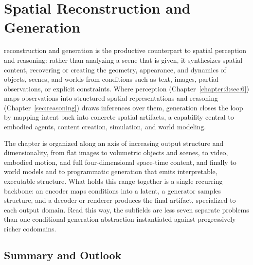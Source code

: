 

\chapter{Spatial Reconstruction and Generation}
\label{sec:generation}


 reconstruction and generation is the productive counterpart to spatial perception and reasoning: rather than analyzing a scene that is given, it synthesizes spatial content, recovering or creating the geometry, appearance, and dynamics of objects, scenes, and worlds from conditions such as text, images, partial observations, or explicit constraints.
Where perception (Chapter~\ref{chapter:3:sec:6}) maps observations into structured spatial representations and reasoning (Chapter~\ref{sec:reasoning}) draws inferences over them, generation closes the loop by mapping intent back into concrete spatial artifacts, a capability central to embodied agents, content creation, simulation, and world modeling.

The chapter is organized along an axis of increasing output structure and dimensionality, from flat images to volumetric objects and scenes, to video, embodied motion, and full four-dimensional space-time content, and finally to world models and to programmatic generation that emits interpretable, executable structure. What holds this range together is a single recurring backbone: an encoder maps conditions into a latent, a generator samples structure, and a decoder or renderer produces the final artifact, specialized to each output domain. Read this way, the subfields are less seven separate problems than one conditional-generation abstraction instantiated against progressively richer codomains.










\section{Summary and Outlook}
\label{sec:p3_s8_8}

